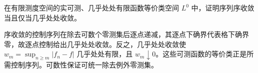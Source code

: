 \begin{exercise}[几乎处处极限]\label{ex:y12-ae-order}
在有限测度空间的实可测、几乎处处有限函数等价类空间 $L^0$ 中，证明序列序收敛当且仅当几乎处处收敛。
\end{exercise}
\begin{solution}
序收敛的控制序列在除去可数个零测集后逐点递减，其逐点下确界代表格下确界零，故逐点控制给出几乎处处收敛。反之，几乎处处收敛使 $w_m=\sup_{n\ge m}|f_n-f|$ 几乎处处有限，且 $w_m\downarrow0$。这些可测函数的等价类正是所需控制序列。可数性保证可统一除去例外零测集。
\end{solution}
